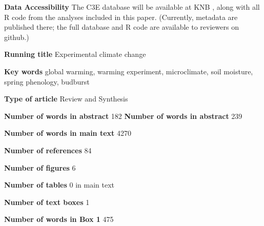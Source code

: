 \documentclass{article}
\begin{document}
\textbf{Data Accessibility} %
The C3E database will be available at KNB \citep{ettinger2017}, along with all R code from the analyses included in this paper. (Currently, metadata are published there; the full database and R code are available to reviewers on github.) 

\textbf{Running title} Experimental climate change

\textbf{Key words} global warming, warming experiment, microclimate, soil moisture, spring phenology, budburst

\textbf{Type of article} Review and Synthesis

\textbf{Number of words in abstract} 182
\textbf{Number of words in abstract} 239

\textbf{Number of words in main text} 4270%

\textbf{Number of references} 84

\textbf{Number of figures} 6

\textbf{Number of tables} 0 in main text

\textbf{Number of text boxes} 1

\textbf{Number of words in Box 1} 475

\clearpage
\end{document}
